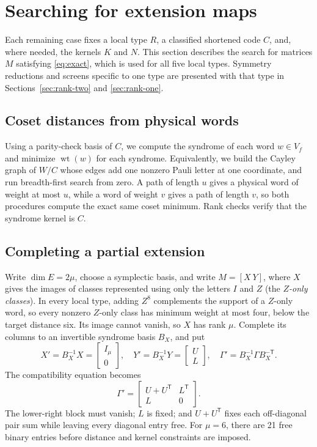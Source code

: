 \documentclass[11pt]{article}
\theoremstyle{definition}
\theoremstyle{remark}
\newcommand{\wt}{\operatorname{wt}}
\newcommand{\tr}{\mathsf T}
\begin{document}
\section{Searching for extension maps}\label{sec:search}

Each remaining case fixes a local type \(R\), a classified shortened
code \(C\), and, where needed, the kernels \(K\) and \(N\). This section
describes the search for matrices \(M\) satisfying \eqref{eq:exact},
which is used for all five local types. Symmetry reductions and screens
specific to one type are presented with that type in
Sections~\ref{sec:rank-two} and \ref{sec:rank-one}.

\subsection{Coset distances from physical words}

Using a parity-check basis of \(C\), we compute the syndrome of each
word \(w\in V_f\) and minimize \(\wt(w)\) for each syndrome.
Equivalently, we build the Cayley graph of \(W/C\) whose edges add one
nonzero Pauli letter at one coordinate, and run breadth-first search
from zero. A path of length \(u\) gives a physical word of weight at
most \(u\), while a word of weight \(v\) gives a path of length \(v\),
so both procedures compute the exact same coset minimum. Rank checks
verify that the syndrome kernel is \(C\).

\subsection{Completing a partial extension}\label{sec:completion}

Write \(\dim E=2\mu\), choose a symplectic basis, and write
\(M=[X\ Y]\), where \(X\) gives the images of classes represented using
only the letters \(I\) and \(Z\) (the \emph{\(Z\)-only classes}). In
every local type, adding \(Z^8\) complements the support of a \(Z\)-only
word, so every nonzero \(Z\)-only class has minimum weight at most four,
below the target distance six. Its image cannot vanish, so \(X\) has
rank \(\mu\). Complete its columns to an invertible syndrome basis
\(B_X\), and put
\[
 X'=B_X^{-1}X=\begin{bmatrix}I_\mu\\0\end{bmatrix},\quad
 Y'=B_X^{-1}Y=\begin{bmatrix}U\\L\end{bmatrix},\quad
 \Gamma'=B_X^{-1}\Gamma B_X^{-\tr}.
\]
The compatibility equation becomes
\begin{equation}\label{eq:Y-normal}
 \Gamma'=\begin{bmatrix}U+U^\tr&L^\tr\\L&0\end{bmatrix}.
\end{equation}
The lower-right block must vanish; \(L\) is fixed; and \(U+U^\tr\) fixes
each off-diagonal pair sum while leaving every diagonal entry free. For
\(\mu=6\), there are 21 free binary entries before distance and kernel
constraints are imposed.
\end{document}
